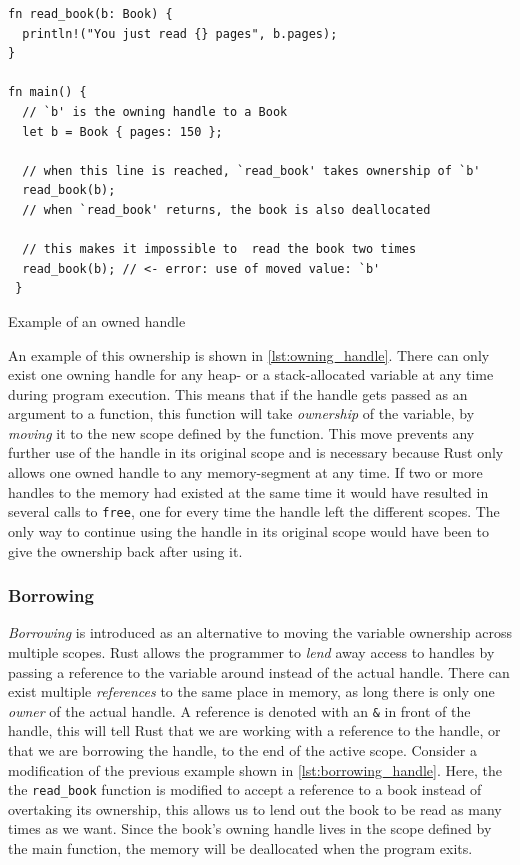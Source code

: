 \begin{listing}[tb]
\begin{verbatim}
fn read_book(b: Book) {
  println!("You just read {} pages", b.pages);
}

fn main() {
  // `b' is the owning handle to a Book
  let b = Book { pages: 150 };

  // when this line is reached, `read_book' takes ownership of `b'
  read_book(b);
  // when `read_book' returns, the book is also deallocated

  // this makes it impossible to  read the book two times
  read_book(b); // <- error: use of moved value: `b'
 }
\end{verbatim}
\caption{Example of an owned handle}
\label{lst:owning_handle}
\end{listing}

An example of this ownership is shown in \autoref{lst:owning_handle}.
There can only exist one owning handle for any heap- or a stack-allocated variable at any time during program execution.
This means that if the handle gets passed as an argument to a function, this function will take \emph{ownership} of the variable, by \emph{moving} it to the new scope defined by the function.
This move prevents any further use of the handle in its original scope and is necessary because Rust only allows one owned handle to any memory-segment at any time.
If two or more handles to the memory had existed at the same time it would have resulted in several calls to \texttt{free}, one for every time the handle left the different scopes.
The only way to continue using the handle in its original scope would have been to give the ownership back after using it.

\subsubsection{Borrowing}
\label{ssec:borrowing}

\emph{Borrowing} is introduced as an alternative to moving the variable ownership across multiple scopes.
Rust allows the programmer to \emph{lend} away access to handles by passing a reference to the variable around instead of the actual handle.
There can exist multiple \emph{references} to the same place in memory, as long there is only one \emph{owner} of the actual handle.
A reference is denoted with an \texttt{\&} in front of the handle, this will tell Rust that we are working with a reference to the handle, or that we are borrowing the handle, to the end of the active scope.
Consider a modification of the previous example shown in \autoref{lst:borrowing_handle}.
Here, the the \texttt{read\_book} function is modified to accept a reference to a book instead of overtaking its ownership, this allows us to lend out the book to be read as many times as we want.
Since the book's owning handle lives in the scope defined by the main function, the memory will be deallocated when the program exits.

